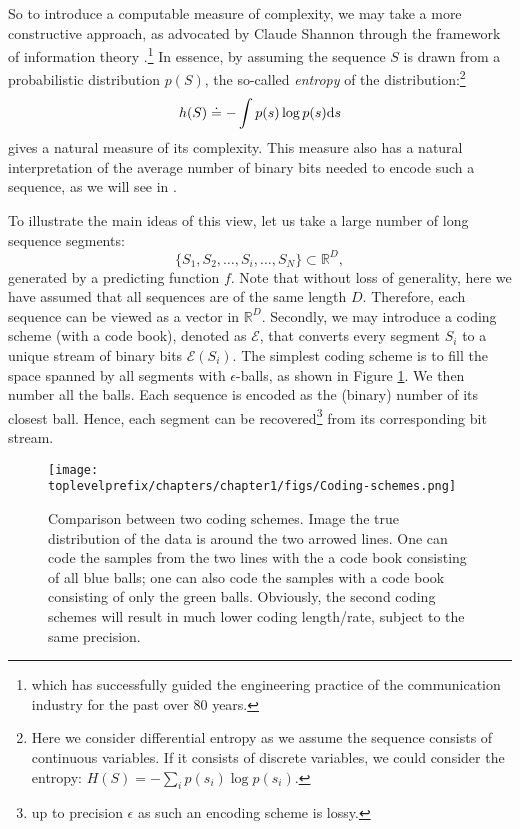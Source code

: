 \documentclass[../../book-main.tex]{subfiles}
\begin{document}
So to introduce a computable measure of complexity, we may take a more constructive approach, as advocated by Claude Shannon through the framework of information theory \cite{Shannon-1948,Cover-Thomas}.\footnote{which has successfully guided the engineering practice of the communication industry for the past over 80 years.} In essence, by assuming the sequence $S$ is drawn from a probabilistic distribution $p(S)$, the so-called {\em entropy} of the distribution:\footnote{Here we consider differential entropy as we assume the sequence consists of continuous variables. If it consists of discrete variables, we could consider the entropy: $H(S) = - \sum_{i}p(s_i) \log p(s_i).$ }
\begin{equation}
    h(S) \doteq -\int p(s) \log p(s) \mathrm{d}s
    \label{eqn:entropy-definition}
\end{equation}
gives a natural measure of its complexity. This measure also has a natural interpretation of the average number of binary bits needed to encode such a sequence, as we will see in .

To illustrate the main ideas of this view, let us take a large number of long sequence segments:
\begin{equation}
    \{S_1, S_2, \ldots, S_i, \ldots, S_N\} \subset \mathbb{R}^D,
\end{equation}
generated by a predicting function $f$. Note that without loss of generality, here we have assumed that all sequences are of the same length $D$. Therefore, each sequence can be viewed as a vector in $\mathbb{R}^D$. Secondly, we may introduce a coding scheme (with a code book), denoted as $\mathcal E$, that converts every segment $S_i$ to a unique stream of binary bits $\mathcal{E}(S_i)$. The simplest coding scheme is to fill the space spanned by all segments with $\epsilon$-balls, as shown in Figure \ref{fig:coding-schemes}. We then number all the balls. Each sequence is encoded as the (binary) number of its closest ball. Hence, each segment can be recovered\footnote{up to precision $\epsilon$ as such an encoding scheme is lossy.} from its corresponding bit stream. 
\begin{figure}
    \centering
    \texttt{[image: \\toplevelprefix/chapters/chapter1/figs/Coding-schemes.png]}
    \caption{Comparison between two coding schemes. Image the true distribution of the data is around the two arrowed lines. One can code the samples from the two lines with the a code book consisting of all blue balls; one can also code the samples with a code book consisting of only the green balls. Obviously, the second coding schemes will result in much lower coding length/rate, subject to the same precision.}
    \label{fig:coding-schemes}
\end{figure}
\end{document}
